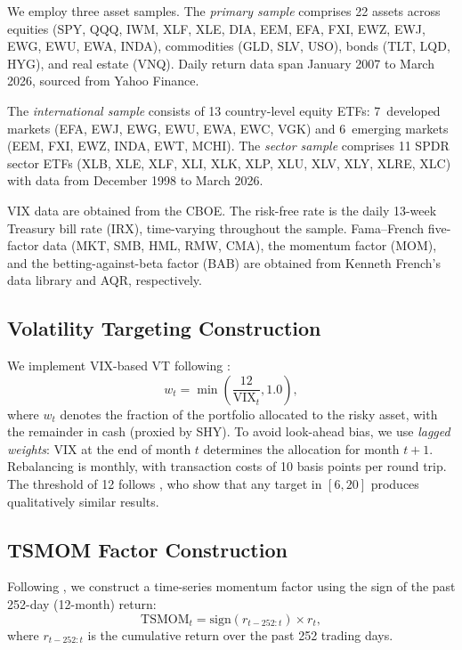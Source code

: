 We employ three asset samples. The \textit{primary sample} comprises 22 assets across equities (SPY, QQQ, IWM, XLF, XLE, DIA, EEM, EFA, FXI, EWZ, EWJ, EWG, EWU, EWA, INDA), commodities (GLD, SLV, USO), bonds (TLT, LQD, HYG), and real estate (VNQ). Daily return data span January 2007 to March 2026, sourced from Yahoo Finance.

The \textit{international sample} consists of 13 country-level equity ETFs: 7~developed markets (EFA, EWJ, EWG, EWU, EWA, EWC, VGK) and 6~emerging markets (EEM, FXI, EWZ, INDA, EWT, MCHI). The \textit{sector sample} comprises 11 SPDR sector ETFs (XLB, XLE, XLF, XLI, XLK, XLP, XLU, XLV, XLY, XLRE, XLC) with data from December 1998 to March 2026.

VIX data are obtained from the CBOE. The risk-free rate is the daily 13-week Treasury bill rate (IRX), time-varying throughout the sample. Fama--French five-factor data (MKT, SMB, HML, RMW, CMA), the momentum factor (MOM), and the betting-against-beta factor (BAB) are obtained from Kenneth French's data library and AQR, respectively.

\subsection{Volatility Targeting Construction}

We implement VIX-based VT following \citet{bozovic2024}:
\begin{equation}
w_t = \min\!\left(\frac{12}{\text{VIX}_t}, 1.0\right),
\label{eq:vt_weight}
\end{equation}
where $w_t$ denotes the fraction of the portfolio allocated to the risky asset, with the remainder in cash (proxied by SHY). To avoid look-ahead bias, we use \textit{lagged weights}: VIX at the end of month $t$ determines the allocation for month $t+1$. Rebalancing is monthly, with transaction costs of 10 basis points per round trip. The threshold of 12 follows \citet{lai2026a}, who show that any target in $[6, 20]$ produces qualitatively similar results.

\subsection{TSMOM Factor Construction}

Following \citet{moskowitz2012}, we construct a time-series momentum factor using the sign of the past 252-day (12-month) return:
\begin{equation}
\text{TSMOM}_t = \text{sign}(r_{t-252:t}) \times r_t,
\label{eq:tsmom}
\end{equation}
where $r_{t-252:t}$ is the cumulative return over the past 252 trading days.


